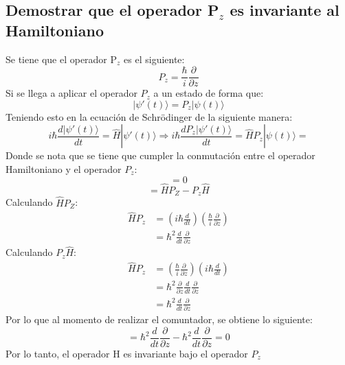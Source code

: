 \documentclass[12pt,letterpaper]{report}
\begin{document}
\subsection*{Demostrar que el operador P$_{z}$ es invariante al Hamiltoniano}
Se tiene que el operador P$_{z}$ es el siguiente:
\begin{equation*}
    P_{z}=\frac{\hbar}{i} \frac{\partial}{\partial z}
\end{equation*}
Si se llega a aplicar el operador $P_z$ a un estado de forma que:
\begin{equation*}
    |\psi'(t)\rangle = P_z |\psi(t) \rangle
\end{equation*}
Teniendo esto en la ecuación de Schr\"odinger de la siguiente manera:
\begin{equation*}
    i\hbar \frac{d |\psi'(t)\rangle } {dt} = \hat{H}|\psi'(t)\rangle \Rightarrow i\hbar \frac{d P_z |\psi'(t)\rangle } {dt} = \hat{H}P_z |\psi(t)\rangle=
\end{equation*}
Donde se nota que se tiene que cumpler la conmutación entre el operador Hamiltoniano y el operador $P_{z}$:
\begin{equation*}
    [\hat{H},P_z]=0
\end{equation*}
\begin{equation*}
    [\hat{H},P_z]=\hat{H}P_Z-P_z\hat{H}
\end{equation*}
Calculando $\hat{H}P_Z$:
\begin{align*}
\hat{H}P_z  &=\left(i\hbar \frac{d}{dt} \right) \left(\frac{\hbar}{i}\frac{\partial}{\partial z} \right)\\
            &=\hbar^2 \frac{d}{dt} \frac{\partial}{\partial z}
\end{align*}
Calculando $P_z \hat{H}$:
\begin{align*}
    \hat{H}P_z  &=\left(\frac{\hbar}{i}\frac{\partial}{\partial z} \right) \left(i\hbar \frac{d}{dt} \right)\\
                &=\hbar^2 \frac{\partial}{\partial z} \frac{d}{dt} \frac{\partial}{\partial z}\\
                &=\hbar^2 \frac{d}{dt} \frac{\partial}{\partial z}
    \end{align*}
Por lo que al momento de realizar el comuntador, se obtiene lo siguiente:
\begin{equation*}
    [\hat{H},P_z]=\hbar^2 \frac{d}{dt} \frac{\partial}{\partial z}-\hbar^2 \frac{d}{dt} \frac{\partial}{\partial z}=0
\end{equation*}
Por lo tanto, el operador H es invariante bajo el operador $P_z$
\end{document}
